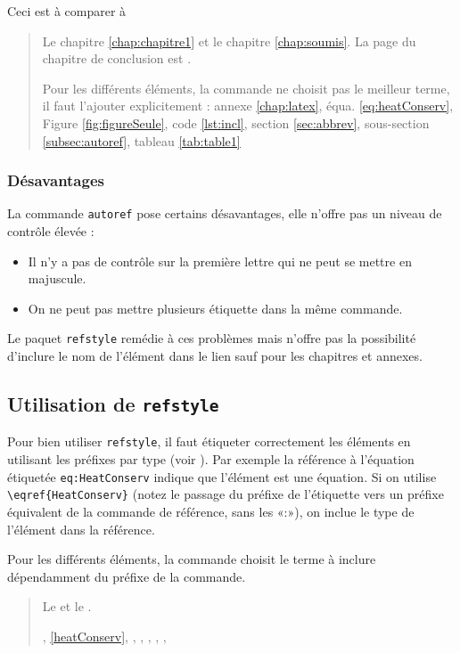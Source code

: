 Ceci est à comparer à
\begin{quote}
	Le chapitre \ref{chap:chapitre1} et le chapitre \ref{chap:soumis}. La page du chapitre de conclusion est \pageref{chap:conclusion}.
	
	Pour les différents éléments, la commande ne choisit pas le meilleur terme, il faut l'ajouter explicitement : annexe \ref{chap:latex}, équa. \ref{eq:heatConserv}, Figure \ref{fig:figureSeule}, code \ref{lst:incl}, section \ref{sec:abbrev}, sous-section \ref{subsec:autoref}, tableau \ref{tab:table1}
\end{quote}

\subsubsection{Désavantages}

La commande \texttt{autoref} pose certains désavantages, elle n'offre pas un niveau de contrôle élevée : 

\begin{itemize}
	\item Il n'y a pas de contrôle sur la première lettre qui ne peut se mettre en majuscule.
	\item On ne peut pas mettre plusieurs étiquette dans la même commande.
\end{itemize}

Le paquet \texttt{refstyle} remédie à ces problèmes mais n'offre pas la possibilité d'inclure le nom de l'élément dans le lien sauf pour les chapitres et annexes.

\subsection{Utilisation de \texttt{refstyle}}
\label{subsec:refstyle}

Pour bien utiliser \texttt{refstyle}, il faut étiqueter correctement les éléments en utilisant les préfixes par type (voir ).
Par exemple la référence à l'équation étiquetée \texttt{eq:HeatConserv} indique que l'élément est une équation. Si on utilise \verb|\eqref{HeatConserv}| (notez le passage du préfixe de l'étiquette vers un préfixe équivalent de la commande de référence, sans les «:»), on inclue le type de l'élément dans la référence.

Pour les différents éléments, la commande choisit le terme à inclure dépendamment du préfixe de la commande.
\begin{quote}
	Le  et le . 
	
	, \eqref{heatConserv}, , , , , , 
\end{quote}

